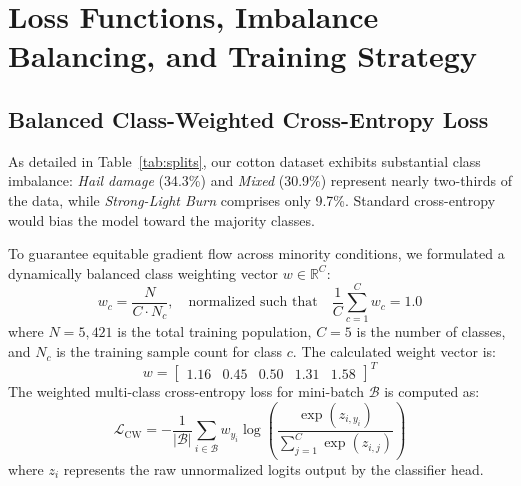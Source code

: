 \documentclass[11pt,a4paper]{article}
\begin{document}
\section{Loss Functions, Imbalance Balancing, and Training Strategy}

\subsection{Balanced Class-Weighted Cross-Entropy Loss}
As detailed in Table~\ref{tab:splits}, our cotton dataset exhibits substantial class imbalance: \textit{Hail damage} (34.3\%) and \textit{Mixed} (30.9\%) represent nearly two-thirds of the data, while \textit{Strong-Light Burn} comprises only 9.7\%. Standard cross-entropy would bias the model toward the majority classes.

To guarantee equitable gradient flow across minority conditions, we formulated a dynamically balanced class weighting vector $w \in \mathbb{R}^C$:
\begin{equation}
    w_c = \frac{N}{C \cdot N_c}, \quad \text{normalized such that} \quad \frac{1}{C}\sum_{c=1}^C w_c = 1.0
\end{equation}
where $N = 5,421$ is the total training population, $C=5$ is the number of classes, and $N_c$ is the training sample count for class $c$. The calculated weight vector is:
\begin{equation}
    w = \begin{bmatrix} 1.16 & 0.45 & 0.50 & 1.31 & 1.58 \end{bmatrix}^T
\end{equation}
The weighted multi-class cross-entropy loss for mini-batch $\mathcal{B}$ is computed as:
\begin{equation}
    \mathcal{L}_{\text{CW}} = -\frac{1}{|\mathcal{B}|} \sum_{i \in \mathcal{B}} w_{y_i} \log \left( \frac{\exp(z_{i, y_i})}{\sum_{j=1}^C \exp(z_{i, j})} \right)
\end{equation}
where $z_i$ represents the raw unnormalized logits output by the classifier head.
\end{document}
